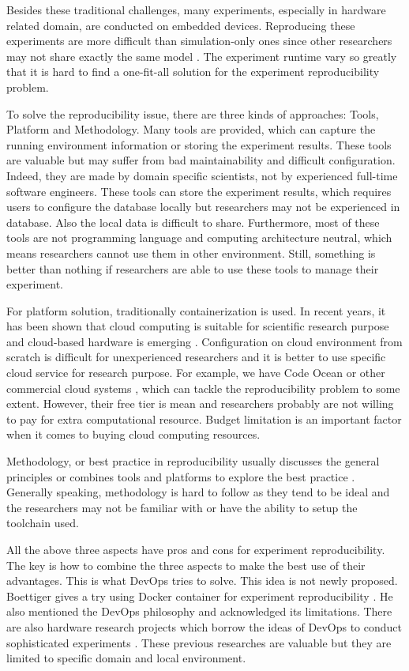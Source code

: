 \documentclass[10pt, conference, compsocconf]{IEEEtran}
\begin{document}
Besides these traditional challenges, many experiments, especially in hardware related domain, are conducted on
embedded devices. Reproducing these experiments are more difficult than simulation-only ones since other researchers may not share exactly the same model \cite{report2017}. The experiment runtime vary so greatly that it is hard to find a
one-fit-all solution for the experiment reproducibility problem.

To solve the reproducibility issue, there are three kinds of approaches: Tools, Platform and Methodology. Many tools \cite{greff2017sacred} are provided, which can capture the running environment information or storing the experiment results. These tools are valuable but may suffer from bad maintainability and difficult configuration. Indeed, they are made by domain specific scientists, not by experienced full-time software engineers. These tools can store the experiment results, which requires users to configure the database locally but researchers may not be experienced in database. Also the local data is difficult to share. Furthermore, most of these tools are not programming language and computing architecture neutral, which means researchers cannot use them in other environment. Still, something is better than nothing if researchers are able to use these tools to manage their experiment.

For platform solution, traditionally containerization is used. In recent years, it has been shown that cloud computing is suitable for scientific research purpose \cite{Howe12} and cloud-based hardware is emerging \cite{cloudhard}. Configuration on cloud environment from scratch is difficult for unexperienced researchers and it is better to use specific cloud service for research purpose. For example, we have Code Ocean or other commercial cloud systems \cite{perkel2018data}, which can tackle the reproducibility problem to some extent. However, their free tier is mean and researchers probably are not willing to pay for extra computational resource. Budget limitation is an important factor when it comes to buying cloud computing resources.

Methodology, or best practice in reproducibility usually discusses the general principles \cite{stodden2014best} or combines tools and platforms to explore the best practice \cite{QashaCW16}. Generally speaking, methodology is hard to follow as they tend to be ideal and the researchers may not be familiar with or have the ability to setup the toolchain used.  

All the above three aspects have pros and cons for experiment reproducibility. The key is how to combine the three aspects to make the best use of their advantages. This is what DevOps tries to solve. This idea is not newly proposed. Boettiger gives a try using Docker container for experiment reproducibility \cite{Boettiger15}.
He also mentioned the DevOps philosophy and acknowledged its limitations.
There are also hardware research projects which borrow the ideas of DevOps to conduct sophisticated experiments \cite{chwalisz2019walker}. These previous researches are valuable but they are limited to specific domain and local environment.
\end{document}
